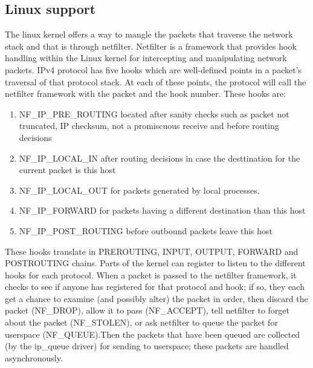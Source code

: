 \subsection{Linux support}
\label{sub-sec:nat-linux}
The linux kernel offers a way to mangle the packets that traverse the network stack and that is through netfilter. Netfilter is a framework that provides hook handling within the Linux kernel for intercepting and manipulating network packets. IPv4 protocol has five hooks which are well-defined points in a packet's traversal of that protocol stack. At each of these points, the protocol will call the netfilter framework with the packet and the hook number.
These hooks are:
\begin{enumerate}
\item NF_IP_PRE_ROUTING located after sanity checks such as packet not truncated, IP checksum, not a promiscuous receive and before routing decisions 
\item NF_IP_LOCAL_IN after routing decisions in case the desttination for the current packet is this host
\item NF_IP_LOCAL_OUT for packets generated by local processes. 
\item NF_IP_FORWARD for packets having a different destination than this host
\item NF_IP_POST_ROUTING before outbound packets leave this host 
\end{enumerate}
These hooks translate in PREROUTING, INPUT, OUTPUT, FORWARD and POSTROUTING chains.
Parts of the kernel can register to listen to the different hooks for each protocol. When a packet is passed to the netfilter framework, it checks to see if anyone has registered for that protocol and hook; if so, they each get a chance to examine (and possibly alter) the packet in order, then discard the packet (NF_DROP), allow it to pass (NF_ACCEPT), tell netfilter to forget about the packet (NF_STOLEN), or ask netfilter to queue the packet for userspace (NF_QUEUE).Then the packets that have been queued are collected (by the ip_queue driver) for sending to userspace; these packets are handled asynchronously.


